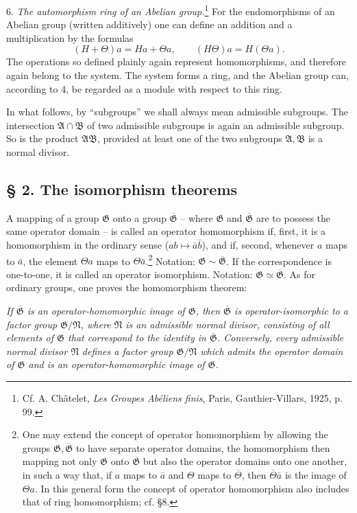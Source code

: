 \documentclass[11pt]{article}
\providecommand{\mG}{\mathfrak{G}}
\providecommand{\mA}{\mathfrak{A}}
\providecommand{\mB}{\mathfrak{B}}
\providecommand{\mN}{\mathfrak{N}}
\begin{document}
6. \emph{The automorphism ring of an Abelian group.}\footnote{Cf. A. Châtelet, \emph{Les Groupes Abéliens finis}, Paris, Gauthier-Villars, 1925, p. 99.} For the endomorphisms of an Abelian group (written additively) one can define an addition and a multiplication by the formulas
\[
        (H+\Theta)a=Ha+\Theta a,\qquad (H\Theta)a=H(\Theta a).
\]
The operations so defined plainly again represent homomorphisms, and therefore again belong to the system. The system forms a ring, and the Abelian group can, according to 4, be regarded as a module with respect to this ring.

In what follows, by ``subgroups'' we shall always mean admissible subgroups. The intersection $\mA\cap\mB$ of two admissible subgroups is again an admissible subgroup. So is the product $\mA\mB$, provided at least one of the two subgroups $\mA,\mB$ is a normal divisor.

\subsection*{§ 2. The isomorphism theorems}

A mapping of a group $\mG$ onto a group $\overline{\mG}$ -- where $\mG$ and $\overline{\mG}$ are to possess the same operator domain -- is called an operator homomorphism if, first, it is a homomorphism in the ordinary sense ($ab\mapsto \bar a\bar b$), and if, second, whenever $a$ maps to $\bar a$, the element $\Theta a$ maps to $\Theta\bar a$.\footnote{One may extend the concept of operator homomorphism by allowing the groups $\mG,\overline{\mG}$ to have separate operator domains, the homomorphism then mapping not only $\mG$ onto $\overline{\mG}$ but also the operator domains onto one another, in such a way that, if $a$ maps to $\bar a$ and $\Theta$ maps to $\overline\Theta$, then $\overline\Theta\bar a$ is the image of $\Theta a$. In this general form the concept of operator homomorphism also includes that of ring homomorphism; cf. §8.} Notation: $\mG\sim\overline{\mG}$. If the correspondence is one-to-one, it is called an operator isomorphism. Notation: $\mG\simeq\overline{\mG}$. As for ordinary groups, one proves the homomorphism theorem:

\emph{If $\overline{\mG}$ is an operator-homomorphic image of $\mG$, then $\overline{\mG}$ is operator-isomorphic to a factor group $\mG/\mN$, where $\mN$ is an admissible normal divisor, consisting of all elements of $\mG$ that correspond to the identity in $\overline{\mG}$. Conversely, every admissible normal divisor $\mN$ defines a factor group $\mG/\mN$ which admits the operator domain of $\mG$ and is an operator-homomorphic image of $\mG$.}
\end{document}
